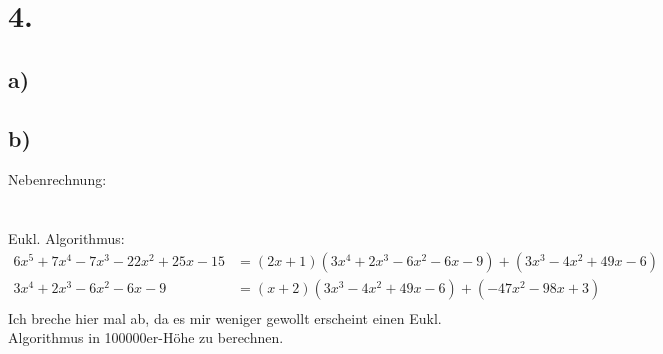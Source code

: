 \documentclass[a4paper]{scrartcl}
\begin{document}
	
\section{4.}	
	\subsection{a)}

	\subsection{b)}
		Nebenrechnung:
		 \\
		 \\
		 \\
		Eukl. Algorithmus:
		\begin{align}
			6x^5+7x^4-7x^3-22x^2+25x-15 &= (2x+1)(3x^4+2x^3-6x^2-6x-9) + (3x^3-4x^2+49x-6) \\
			3x^4+2x^3-6x^2-6x-9 &= (x+2) (3x^3-4x^2+49x-6) + (-47x^2-98x+3) \\
		\end{align}
		Ich breche hier mal ab, da es mir weniger gewollt erscheint einen Eukl. Algorithmus in 
		100000er-Höhe zu berechnen.
	
\end{document}
